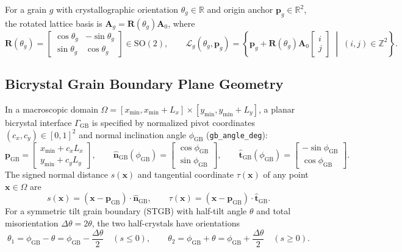\documentclass[11pt,a4paper]{article}
\newcommand{\R}{\mathbb{R}}
\newcommand{\Z}{\mathbb{Z}}
\newcommand{\code}[1]{\texttt{#1}}
\begin{document}
For a grain $g$ with crystallographic orientation $\theta_g \in \R$ and origin anchor $\mathbf{p}_g \in \R^2$, the rotated lattice basis is $\mathbf{A}_g = \mathbf{R}(\theta_g)\mathbf{A}_0$, where
\begin{equation}
  \mathbf{R}(\theta_g) =
  \begin{bmatrix}
    \cos\theta_g & -\sin\theta_g \\
    \sin\theta_g & \cos\theta_g
  \end{bmatrix} \in \mathrm{SO}(2), \qquad
  \mathcal{L}_g(\theta_g, \mathbf{p}_g) = \left\{ \mathbf{p}_g + \mathbf{R}(\theta_g)\mathbf{A}_0\begin{bmatrix} i \\ j \end{bmatrix} \;\middle|\; (i,j) \in \Z^2 \right\}.
\end{equation}

\subsection{Bicrystal Grain Boundary Plane Geometry}
In a macroscopic domain $\Omega = [x_{\min}, x_{\min}+L_x] \times [y_{\min}, y_{\min}+L_y]$, a planar bicrystal interface $\Gamma_{\text{GB}}$ is specified by normalized pivot coordinates $(c_x, c_y) \in [0,1]^2$ and normal inclination angle $\phi_{\text{GB}}$ (\code{gb\_angle\_deg}):
\begin{equation}
  \mathbf{p}_{\text{GB}} = \begin{bmatrix} x_{\min} + c_x L_x \\ y_{\min} + c_y L_y \end{bmatrix}, \qquad
  \hat{\mathbf{n}}_{\text{GB}}(\phi_{\text{GB}}) = \begin{bmatrix} \cos\phi_{\text{GB}} \\ \sin\phi_{\text{GB}} \end{bmatrix}, \qquad
  \hat{\mathbf{t}}_{\text{GB}}(\phi_{\text{GB}}) = \begin{bmatrix} -\sin\phi_{\text{GB}} \\ \cos\phi_{\text{GB}} \end{bmatrix}.
\end{equation}
The signed normal distance $s(\mathbf{x})$ and tangential coordinate $\tau(\mathbf{x})$ of any point $\mathbf{x} \in \Omega$ are
\begin{equation}
  s(\mathbf{x}) = (\mathbf{x} - \mathbf{p}_{\text{GB}})\cdot\hat{\mathbf{n}}_{\text{GB}}, \qquad
  \tau(\mathbf{x}) = (\mathbf{x} - \mathbf{p}_{\text{GB}})\cdot\hat{\mathbf{t}}_{\text{GB}}.
\end{equation}
For a symmetric tilt grain boundary (STGB) with half-tilt angle $\theta$ and total misorientation $\Delta\theta = 2\theta$, the two half-crystals have orientations
\begin{equation}
  \theta_1 = \phi_{\text{GB}} - \theta = \phi_{\text{GB}} - \frac{\Delta\theta}{2} \quad (s \le 0), \qquad
  \theta_2 = \phi_{\text{GB}} + \theta = \phi_{\text{GB}} + \frac{\Delta\theta}{2} \quad (s \ge 0).
\end{equation}
\end{document}
